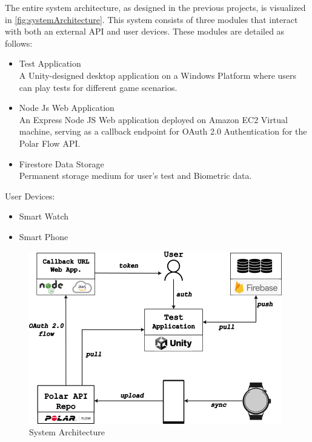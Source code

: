 \documentclass{report}
\begin{document}
The entire system architecture, as designed in the previous projects, is visualized in \autoref{fig:systemArchitecture}. This system consists of three modules that interact with both an external API and user devices. These modules are detailed as follows:

\begin{itemize}
\item{Test Application}\\
A Unity-designed desktop application on a Windows Platform where users can play tests for different game scenarios.
\item {Node Js Web Application}\\
An Express Node JS Web application deployed on Amazon EC2 Virtual machine, serving as a callback endpoint for OAuth 2.0 Authentication for the Polar Flow API. 
\item {Firestore Data Storage}\\
Permanent storage medium for user's test and Biometric data.
\end{itemize}
User Devices:
\begin{itemize}
\item{Smart Watch}
\item {Smart Phone}
\end{itemize}

\begin{figure}[h]
\includegraphics{images/architecture.png}
\caption{System Architecture}
\label{fig:systemArchitecture}
\centering
\end{figure}
\end{document}
